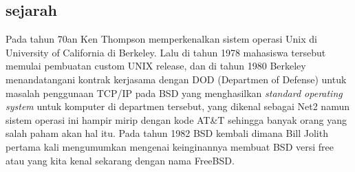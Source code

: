 \subsection{sejarah}
	Pada tahun 70an Ken Thompson memperkenalkan sistem operasi Unix di University of California di Berkeley. Lalu di tahun 1978 mahasiswa tersebut memulai pembuatan custom UNIX release, dan di tahun 1980 Berkeley menandatangani kontrak kerjasama dengan DOD (Departmen of Defense) untuk masalah penggunaan TCP/IP pada BSD yang menghasilkan \textit{standard operating system} untuk komputer di departmen tersebut, yang dikenal sebagai Net2 namun sistem operasi ini hampir mirip dengan kode AT\&T sehingga banyak orang yang salah paham akan hal itu. Pada tahun 1982 BSD kembali dimana Bill Jolith pertama kali mengumumkan mengenai keinginannya membuat BSD versi free atau yang kita kenal sekarang dengan nama FreeBSD.
	
	